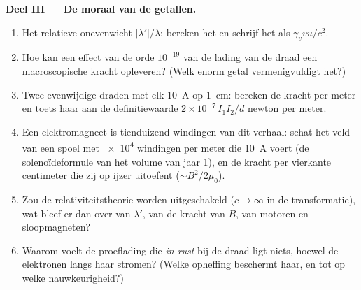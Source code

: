 \begin{problem}
\medskip\noindent\textbf{Deel III --- De moraal van de getallen.}
\begin{enumerate}[resume]
  \item Het relatieve onevenwicht $|\lambda'|/\lambda$: bereken het en
        schrijf het als $\gamma_v vu/c^2$.
  \item Hoe kan een effect van de orde $10^{-19}$ van de lading van de
        draad een macroscopische kracht opleveren? (Welk enorm getal
        vermenigvuldigt het?)
  \item Twee evenwijdige draden met elk \qty{10}{A} op \qty{1}{cm}:
        bereken de kracht per meter en toets haar aan de
        definitiewaarde $2 \times 10^{-7}\,I_1I_2/d$ newton per meter.
  \item Een elektromagneet is tienduizend windingen van dit verhaal:
        schat het veld van een spoel met \qty{e4}{} windingen per meter
        die \qty{10}{A} voert (de solenoïdeformule van het volume van
        jaar 1), en de kracht per vierkante centimeter die zij op ijzer
        uitoefent ($\sim B^2/2\mu_0$).
  \item Zou de relativiteitstheorie worden uitgeschakeld ($c \to \infty$
        in de transformatie), wat bleef er dan over van $\lambda'$, van
        de kracht van $B$, van motoren en sloopmagneten?
  \item Waarom voelt de proeflading die \emph{in rust} bij de draad ligt
        niets, hoewel de elektronen langs haar stromen? (Welke
        opheffing beschermt haar, en tot op welke nauwkeurigheid?)
\end{enumerate}


\end{problem}
